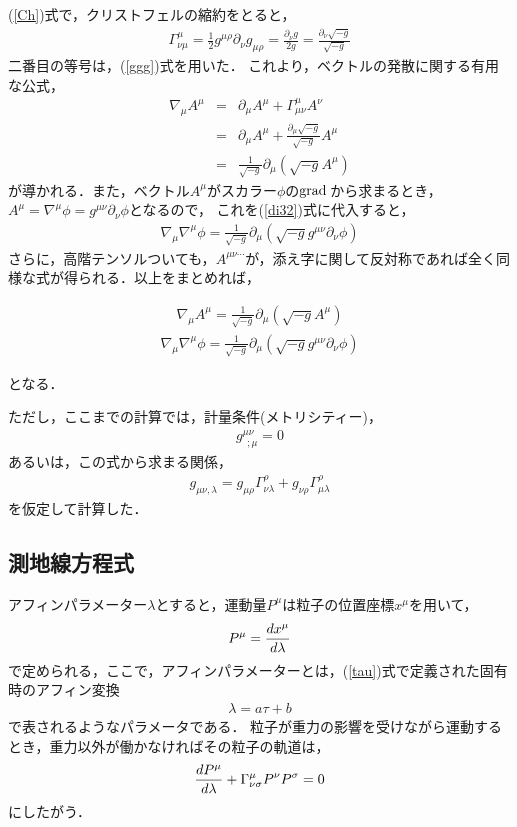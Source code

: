 (\ref{Ch})式で，クリストフェルの縮約をとると，
\begin{eqnarray}
\label{Chdetg}
\Gamma^{\mu}_{\nu\mu}=\frac{1}{2}g^{\mu\rho}\partial_\nu g_{\mu\rho}=\frac{\partial_{\nu} g}{2g}=\frac{\partial_{\nu} \sqrt{-g}}{\sqrt{-g}}
\end{eqnarray}
二番目の等号は，(\ref{ggg})式を用いた．
これより，ベクトルの発散に関する有用な公式，
\begin{eqnarray}
\label{di32}
\nabla_{\mu}A^{\mu}&=&\partial_{\mu}A^{\mu}+\Gamma^{\mu}_{\mu\nu}A^{\nu} \nonumber \\
&=&\partial_{\mu}A^{\mu}+\frac{\partial_{\mu} \sqrt{-g}}{\sqrt{-g}}A^{\mu} \nonumber \\
&=&\frac{1}{\sqrt{-g}}\partial_{\mu}(\sqrt{-g}A^{\mu})
\end{eqnarray}
が導かれる．また，ベクトル$A^{\mu}$がスカラー$\phi$の$\mathrm{grad}\,$から求まるとき，$A^{\mu}=\nabla^{\mu} \phi=g^{\mu\nu}\partial_{\nu}\phi$となるので，
これを(\ref{di32})式に代入すると，
\begin{eqnarray}
\nabla_{\mu}\nabla^{\mu}\phi=\frac{1}{\sqrt{-g}}\partial_{\mu}(\sqrt{-g}g^{\mu\nu}\partial_{\nu}\phi)
\end{eqnarray}
さらに，高階テンソルついても，$A^{\mu\nu\cdots}$が，添え字に関して反対称であれば全く同様な式が得られる．以上をまとめれば，
\begin{empheqboxed}
\begin{eqnarray}
\label{a34}
\nabla_{\mu}A^{\mu}=\frac{1}{\sqrt{-g}}\partial_{\mu}(\sqrt{-g}A^{\mu})
\end{eqnarray}
\begin{eqnarray}
\nabla_{\mu}\nabla^{\mu}\phi=\frac{1}{\sqrt{-g}}\partial_{\mu}(\sqrt{-g}g^{\mu\nu}\partial_{\nu}\phi)
\end{eqnarray}
\end{empheqboxed}
となる．

ただし，ここまでの計算では，計量条件(メトリシティー)，
\begin{eqnarray}
g^{\mu\nu}_{\ \ ;\mu}=0
\end{eqnarray}
あるいは，この式から求まる関係，
\begin{eqnarray}
\label{metometo}
g_{\mu\nu,\lambda}=g_{\mu\rho}\Gamma^{\rho}_{\nu\lambda}+g_{\nu\rho}\Gamma^{\rho}_{\mu\lambda}
\end{eqnarray}
を仮定して計算した．
\subsection{測地線方程式}
アフィンパラメーター$\lambda$とすると，運動量$P^{\mu}$は粒子の位置座標$x^{\mu}$を用いて，
\begin{eqnarray}
\label{D2}
P^{\mu}={d x^{\mu}\over d\lambda}
\end{eqnarray}で定められる，ここで，アフィンパラメーターとは，(\ref{tau})式で定義された固有時のアフィン変換
\begin{eqnarray}
\lambda=a\tau+b
\end{eqnarray}で表されるようなパラメータである．
粒子が重力の影響を受けながら運動するとき，重力以外が働かなければその粒子の軌道は，
\begin{eqnarray}
\label{Go}
{d P^{\mu}\over d\lambda}+\Gamma^{\mu}_{\nu\sigma}P^{\nu}P^{\sigma}=0
\end{eqnarray}
にしたがう．
